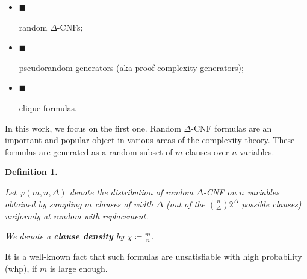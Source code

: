\documentclass[10pt,a4paper]{article}
\begin{document}
\begin{itemize}


\item[] 
$\blacksquare$ 


random $\Delta$-CNFs;\par





\item[] 
$\blacksquare$ 


pseudorandom generators (aka proof complexity generators);\par





\item[] 
$\blacksquare$ 


clique formulas.\par





\end{itemize}




In this work, we focus on the first one. Random $\Delta$-CNF formulas are an important and popular
object in various areas of the complexity
theory. These formulas are generated as a random subset of $m$ clauses over $n$ variables.\par





\par\medskip\noindent\textbf{
\textbf{Definition 1}\textbf{.}
}\par



\emph{Let $\varphi(m,n,\Delta)$ denote the distribution of random $\Delta$-CNF on $n$ variables
obtained by sampling $m$ clauses of width $\Delta$ (out of the $\binom{n}{\Delta}2^{\Delta}$
possible clauses) uniformly at random with replacement.}\par




\emph{We denote a \textbf{clause density} by $\chi\coloneqq\frac{m}{n}$.}\par






It is a well-known fact that such formulas are unsatisfiable with high probability (whp), if $m$ is large
enough.\par
\end{document}
